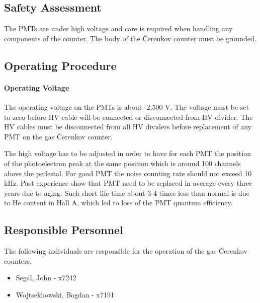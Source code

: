 \subsection{Safety Assessment}

\begin{safetyen}{10}{10}
The PMTs are under high voltage and care is required when handling any 
components of the counter. The body of the \v{C}erenkov counter must be grounded. 
\end{safetyen}

\subsection{Operating Procedure}

\paragraph{Operating Voltage}

\begin{safetyen}{10}{10}
The operating voltage on the PMTs is about -2,500 V. The voltage must be set to
zero before HV cable will be connected or disconnected from HV divider.
The HV cables must be disconnected from all HV dividers before replacement
of any PMT on the gas \v{C}erenkov counter. 
\end{safetyen}

The high voltage has to be adjusted in order to have for each PMT 
the position of the photoelectron peak at the same position 
which is around 100 channels above the pedestal. 
For good PMT the noise counting rate should not exceed 10 kHz.
Past experience show that PMT need to be replaced in average
every three years due to aging. Such short life time about 3-4 
times less than normal is due to He content in Hall A,
which led to loss of the PMT quantum efficiency.

\subsection{Responsible Personnel} 
The following individuals are responsible for the operation 
of the gas \v{C}erenkov counters.
 
\begin{itemize}
\item[~]Segal, John - x7242 
\item[~]Wojtsekhowski, Bogdan - x7191 
\end{itemize} 







